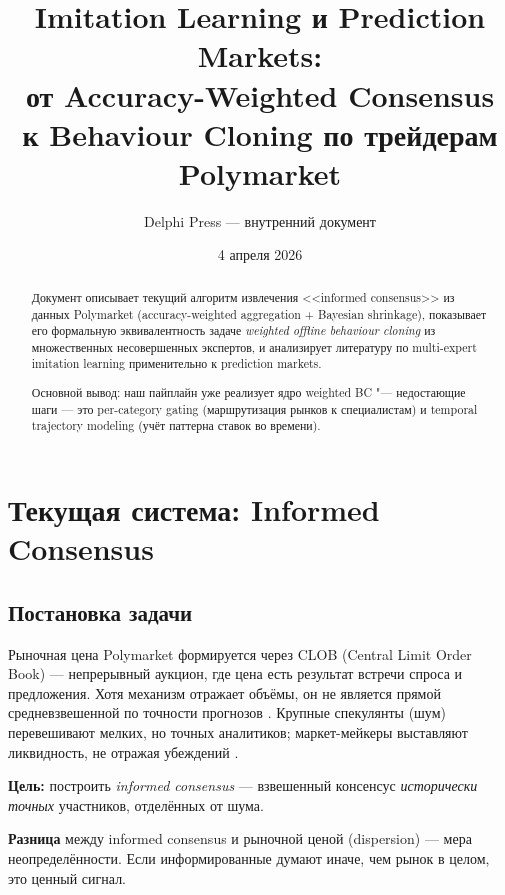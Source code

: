 \documentclass[a4paper, 11pt]{article}
\title{%
  Imitation Learning и Prediction Markets:\\
  от Accuracy-Weighted Consensus\\
  к Behaviour Cloning по трейдерам Polymarket%
}
\author{Delphi Press --- внутренний документ}
\date{4 апреля 2026}
\begin{document}
\maketitle

\begin{abstract}
Документ описывает текущий алгоритм извлечения <<informed consensus>> из данных Polymarket
(accuracy-weighted aggregation + Bayesian shrinkage),
показывает его формальную эквивалентность задаче \emph{weighted offline behaviour cloning}
из множественных несовершенных экспертов,
и анализирует литературу по multi-expert imitation learning
применительно к prediction markets.

Основной вывод: наш пайплайн уже реализует ядро weighted BC "---
недостающие шаги --- это per-category gating (маршрутизация рынков к специалистам)
и temporal trajectory modeling (учёт паттерна ставок во времени).
\end{abstract}

\tableofcontents
\newpage

\section{Текущая система: Informed Consensus}
\label{sec:current}

\subsection{Постановка задачи}

Рыночная цена Polymarket формируется через CLOB (Central Limit Order Book) ---
непрерывный аукцион, где цена есть результат встречи спроса и предложения.
Хотя механизм отражает объёмы, он не является прямой средневзвешенной
по точности прогнозов \citep{wolfers2004prediction}.
Крупные спекулянты (шум) перевешивают мелких, но точных аналитиков;
маркет-мейкеры выставляют ликвидность, не отражая убеждений
\citep{manski2006interpreting}.

\textbf{Цель:} построить \emph{informed consensus} --- взвешенный консенсус
\emph{исторически точных} участников, отделённых от шума.

\textbf{Разница} между informed consensus и рыночной ценой (dispersion) ---
мера неопределённости.
Если информированные думают иначе, чем рынок в целом, это ценный сигнал.

\end{document}
